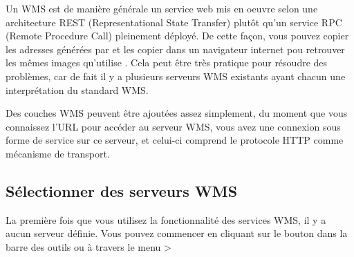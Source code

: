 Un WMS est de manière générale un service web mis en oeuvre selon une architecture REST (Representational State Transfer) plutôt qu'un service RPC (Remote Procedure Call) pleinement déployé. De cette façon, vous pouvez copier les adresses générées par \qg et les copier dans un navigateur internet pou retrouver les mêmes images qu'utilise \qg. Cela peut être très pratique pour résoudre des problèmes, car de fait il y a plusieurs serveurs WMS existants ayant chacun une interprétation du standard WMS.

Des couches WMS peuvent être ajoutées assez simplement, du moment que vous connaissez l'URL pour accéder au serveur WMS, vous avez une connexion sous forme de service sur ce serveur, et celui-ci comprend le protocole HTTP comme mécanisme de transport.

\subsection{Sélectionner des serveurs WMS}\label{sec:ogc-wms-servers}

La première fois que vous utilisez la fonctionnalité des services WMS, il y a
aucun serveur définie. Vous pouvez commencer en cliquant sur le bouton
 dans la barre des outils ou à travers le menu >

